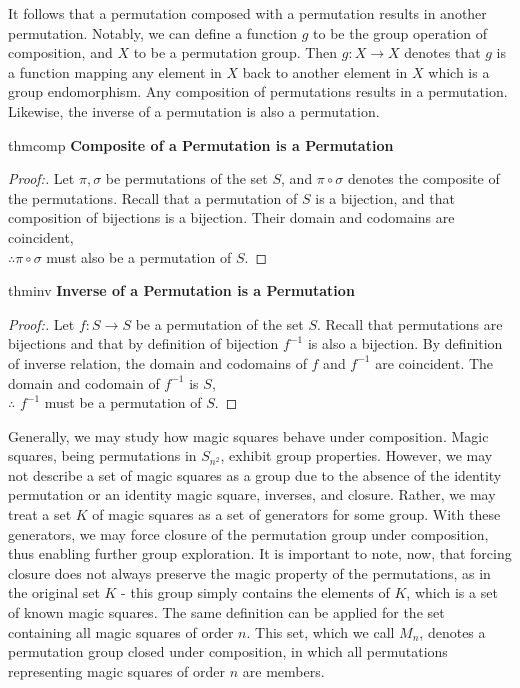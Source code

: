 \documentclass[12pt]{report}
\begin{document}
\par It follows that a permutation composed with a permutation results in another permutation.
Notably, we can define a function $g$ to be the group operation of composition, and $X$ to be a
permutation group. Then $g:X\rightarrow X$ denotes that $g$ is a function mapping any element in
$X$ back to another element in $X$ which is a group endomorphism. Any composition of permutations
results in a permutation. Likewise, the inverse of a permutation is also a
permutation\cite{Deskins}.

\singlespacing{}
\begin{thmbox}{}{thmcomp}
  \textbf{Composite of a Permutation is a Permutation}
  \begin{proof}[Proof:]
    Let $\pi,\sigma$ be permutations of the set $S$, and $\pi\circ\sigma$ denotes the composite of
    the permutations. Recall that a permutation of $S$ is a bijection, and that composition of
    bijections is a bijection. Their domain and codomains are coincident,\\ $\therefore
      \pi\circ\sigma$
    must also be a permutation of $S$.
  \end{proof}
\end{thmbox}
\doublespacing{}

\singlespacing{}
\begin{thmbox}{}{thminv}
  \textbf{Inverse of a Permutation is a Permutation}
  \begin{proof}[Proof:]
    Let $f : S \rightarrow S$ be a permutation of the set $S$. Recall that permutations are
    bijections and that by definition of bijection $f^{-1}$ is also a bijection. By definition of
    inverse relation, the domain and codomains of $f$ and $f^{-1}$ are coincident. The domain and
    codomain of $f^{-1}$ is $S$,\\ $\therefore$ $f^{-1}$ must be a permutation of $S$.
  \end{proof}
\end{thmbox}
\doublespacing{}

\par Generally, we may study how magic squares behave under composition. Magic squares, being
permutations in $S_{n^2}$, exhibit group properties. However, we may not describe a set of magic
squares as a group due to the absence of the identity permutation or an identity magic square,
inverses, and closure. Rather, we may treat a set $K$ of magic squares as a set of generators for
some group. With these generators, we may force closure of the permutation group under composition,
thus enabling further group exploration. It is important to note, now, that forcing closure does
not always preserve the magic property of the permutations, as in the original set $K$ \hyphen{}
this group simply contains the elements of $K$, which is a set of known magic squares. The same
definition can be applied for the set containing all magic squares of order $n$. This set, which we
call $M_n$, denotes a permutation group closed under composition, in which all permutations
representing magic squares of order $n$ are members.
\end{document}
